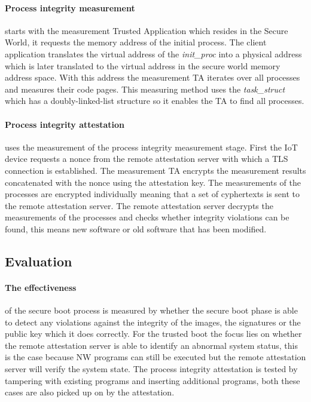 \documentclass{report}
\begin{document}
\paragraph*{Process integrity measurement}
starts with the measurement Trusted Application which resides in the Secure World, it requests the memory address of the initial process. The client application translates the virtual address of the \textit{init\_proc} into a physical address which is later translated to the virtual address in the secure world memory address space. With this address the measurement TA iterates over all processes and measures their code pages. This measuring method uses the \textit{task\_struct} which has a doubly-linked-list structure so it enables the TA to find all processes. 

\paragraph*{Process integrity attestation}
uses the measurement of the process integrity measurement stage. First the IoT device requests a nonce from the remote attestation server with which a TLS connection is established. The measurement TA encrypts the measurement results concatenated with the nonce using the attestation key. The measurements of the processes are encrypted individually meaning that a set of cyphertexts is sent to the remote attestation server. The remote attestation server decrypts the measurements of the processes and checks whether integrity violations can be found, this means new software or old software that has been modified.

\subsection*{Evaluation} 

\paragraph*{The effectiveness}
of the secure boot process is measured by whether the secure boot phase is able to detect any violations against the integrity of the images, the signatures or the public key which it does correctly. For the trusted boot the focus lies on whether the remote attestation server is able to identify an abnormal system status, this is the case because NW programs can still be executed but the remote attestation server will verify the system state. The process integrity attestation is tested by tampering with existing programs and inserting additional programs, both these cases are also picked up on by the attestation. 
\end{document}
